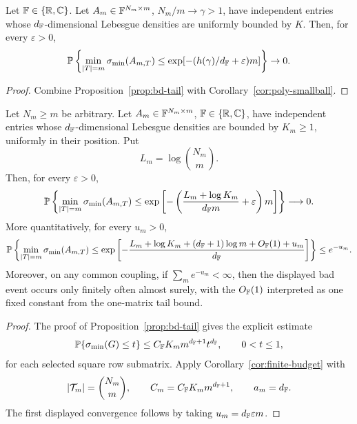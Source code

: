 \begin{corollary}\label{cor:bd-lower}
Let \(\mathbb{F}\in\{\mathbb{R},\mathbb{C}\}\).  Let \(A_m\in\mathbb{F}^{N_m\times m}\), \(N_m/m\to\gamma>1\),
have independent entries whose \(d_{\mathbb{F}}\)-dimensional Lebesgue densities are
uniformly bounded by \(K\).  Then, for every \(\varepsilon>0\),
\[
  \mathbb{P}\left\{
  \min_{|T|=m}\sigma_{\min}(A_{m,T})
  \le \exp[-(h(\gamma)/d_{\mathbb{F}}+\varepsilon)m]
  \right\}\to0.
\]
\end{corollary}

\begin{proof}
Combine Proposition~\ref{prop:bd-tail} with
Corollary~\ref{cor:poly-smallball}.
\end{proof}

\begin{corollary}\label{cor:finite-entropy-square}
Let \(N_m\ge m\) be arbitrary.  Let \(A_m\in\mathbb{F}^{N_m\times m}\),
\(\mathbb{F}\in\{\mathbb{R},\mathbb{C}\}\), have independent entries whose \(d_{\mathbb{F}}\)-dimensional
Lebesgue densities are bounded by \(K_m\ge1\), uniformly in their position.  Put
\[
  L_m=\log\binom{N_m}{m}.
\]
Then, for every \(\varepsilon>0\),
\[
  \mathbb{P}\left\{
  \min_{|T|=m}\sigma_{\min}(A_{m,T})
  \le
  \exp\left[-\left(\frac{L_m+\log K_m}{d_{\mathbb{F}} m}+\varepsilon\right)m\right]
  \right\}
  \longrightarrow0.
\]
More quantitatively, for every \(u_m>0\),
\[
  \mathbb{P}\left\{
  \min_{|T|=m}\sigma_{\min}(A_{m,T})
  \le
  \exp\left[-\frac{L_m+\log K_m+(d_{\mathbb{F}}+1)\log m+O_{\mathbb{F}}(1)+u_m}{d_{\mathbb{F}}}\right]
  \right\}
  \le e^{-u_m}.
\]
Moreover, on any common coupling, if \(\sum_m e^{-u_m}<\infty\), then the
displayed bad event occurs only finitely often almost surely, with the
\(O_{\mathbb{F}}(1)\) interpreted as one fixed constant from the one-matrix tail bound.
\end{corollary}

\begin{proof}
The proof of Proposition~\ref{prop:bd-tail} gives the explicit estimate
\[
  \mathbb{P}\{\sigma_{\min}(G)\le t\}\le C_{\mathbb{F}} K_m m^{d_{\mathbb{F}}+1}t^{d_{\mathbb{F}}},\qquad 0<t\le1,
\]
for each selected square row submatrix.  Apply
Corollary~\ref{cor:finite-budget} with
\[
  |\mathcal T_m|=\binom{N_m}{m},\qquad
  C_m=C_{\mathbb{F}} K_m m^{d_{\mathbb{F}}+1},\qquad
  a_m=d_{\mathbb{F}}.
\]
The first displayed convergence follows by taking \(u_m=d_{\mathbb{F}}\varepsilon m\).
\end{proof}

